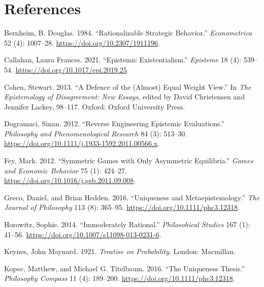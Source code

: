 \documentclass[
  11pt,
]{article}
\newlength{\cslhangindent}
\newlength{\cslentryspacingunit} %
\newenvironment{CSLReferences}[2] %
 {%
  \setlength{\parindent}{0pt}
  \ifodd #1
  \let\oldpar\par
  \def\par{\hangindent=\cslhangindent\oldpar}
  \fi
  \setlength{\parskip}{#2\cslentryspacingunit}
 }%
 {}
\begin{document}
\hypertarget{references}{%
\section*{References}\label{references}}

\hypertarget{refs}{}
\begin{CSLReferences}{1}{0}
\leavevmode{}%
Bernheim, B. Douglas. 1984. {``Rationalizable Strategic Behavior.''} \emph{Econometrica} 52 (4): 1007--28. \url{https://doi.org/10.2307/1911196}.

\leavevmode{}%
Callahan, Laura Frances. 2021. {``Epistemic Existentialism.''} \emph{Episteme} 18 (4): 539--54. \url{https://doi.org/10.1017/epi.2019.25}.

\leavevmode{}%
Cohen, Stewart. 2013. {``A Defence of the (Almost) Equal Weight View.''} In \emph{The Epistemology of Disagreement: New Essays}, edited by David Christensen and Jennifer Lackey, 98--117. Oxford: Oxford University Press.

\leavevmode{}%
Dogramaci, Sinan. 2012. {``Reverse Engineering Epistemic Evaluations.''} \emph{Philosophy and Phenomenological Research} 84 (3): 513--30. \url{https://doi.org/10.1111/j.1933-1592.2011.00566.x}.

\leavevmode{}%
Fey, Mark. 2012. {``Symmetric Games with Only Asymmetric Equilibria.''} \emph{Games and Economic Behavior} 75 (1): 424--27. \url{https://doi.org/10.1016/j.geb.2011.09.008}.

\leavevmode{}%
Greco, Daniel, and Brian Hedden. 2016. {``Uniqueness and Metaepistemology.''} \emph{The Journal of Philosophy} 113 (8): 365--95. \url{https://doi.org/10.1111/phc3.12318}.

\leavevmode{}%
Horowitz, Sophie. 2014. {``Immoderately Rational.''} \emph{Philosohical Studies} 167 (1): 41--56. \url{https://doi.org/10.1007/s11098-013-0231-6}.

\leavevmode{}%
Keynes, John Maynard. 1921. \emph{Treatise on Probability}. London: Macmillan.

\leavevmode{}%
Kopec, Matthew, and Michael G. Titelbaum. 2016. {``The Uniqueness Thesis.''} \emph{Philosophy Compass} 11 (4): 189--200. \url{https://doi.org/10.1111/phc3.12318}.


\end{CSLReferences}
\end{document}
